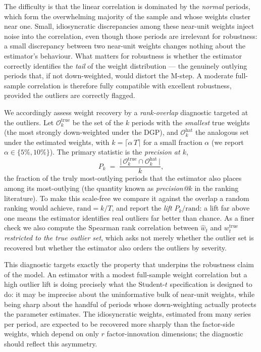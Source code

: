\documentclass[11pt, a4paper, oneside]{article}
\begin{document}
The difficulty is that the linear correlation is dominated by the
\emph{normal} periods, which form the overwhelming majority of the
sample and whose weights cluster near one. Small, idiosyncratic
discrepancies among these near-unit weights inject noise into the
correlation, even though those periods are irrelevant for robustness:
a small discrepancy between two near-unit weights changes nothing
about the estimator's behaviour. What matters for robustness is
whether the estimator correctly identifies the \emph{tail} of the
weight distribution — the genuinely outlying periods that, if not
down-weighted, would distort the M-step. A moderate full-sample
correlation is therefore fully compatible with excellent robustness,
provided the outliers are correctly flagged.

We accordingly assess weight recovery by a \emph{rank-overlap}
diagnostic targeted at the outliers. Let $\mathcal{O}^{\text{true}}_k$
be the set of the $k$ periods with the \emph{smallest} true weights
(the most strongly down-weighted under the DGP), and
$\mathcal{O}^{\text{hat}}_k$ the analogous set under the estimated
weights, with $k = \lceil \alpha\, T \rceil$ for a small fraction
$\alpha$ (we report $\alpha \in \{5\%, 10\%\}$). The primary statistic
is the \emph{precision at $k$},
\[
P_k
\;=\;
\frac{\big|\,\mathcal{O}^{\text{true}}_k \cap
\mathcal{O}^{\text{hat}}_k\,\big|}{k},
\]
the fraction of the truly most-outlying periods that the estimator
also places among its most-outlying (the quantity known as
\emph{precision@$k$} in the ranking literature). To make this
scale-free we compare it against the overlap a random ranking would
achieve, $\mathrm{rand} = k/T$, and report the \emph{lift}
$P_k / \mathrm{rand}$: a lift far above one means the estimator
identifies real outliers far better than chance. As a finer check we also compute the Spearman rank
correlation between $\hat{w}_t$ and $w^{\text{true}}_t$ \emph{restricted
to the true outlier set}, which asks not merely whether the outlier
set is recovered but whether the estimator also orders the outliers by
severity.

This diagnostic targets exactly the property that underpins the
robustness claim of the model. An estimator with a modest full-sample
weight correlation but a high outlier lift is doing precisely what the
Student-$t$ specification is designed to do: it may be imprecise about
the uninformative bulk of near-unit weights, while being sharp about
the handful of periods whose down-weighting actually protects the
parameter estimates. The idiosyncratic weights, estimated from many
series per period, are expected to be recovered more sharply than the
factor-side weights, which depend on only $r$ factor-innovation
dimensions; the diagnostic should reflect this asymmetry.
\end{document}
